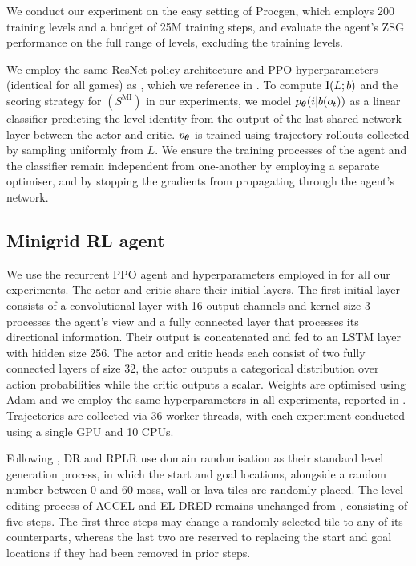 We conduct our experiment on the easy setting of Procgen, which employs 200 training levels and a budget of 25M training steps, and evaluate the agent's ZSG performance on the full range of levels, excluding the training levels.

We employ the same ResNet policy architecture and PPO hyperparameters (identical for all games) as \cite{procgen}, which we reference in . To compute $\text{I}(L;b)$ and the scoring strategy for $(S^\text{MI})$ in our experiments, we model $p_{\bm{\theta}}(i|b(o_t))$ as a linear classifier predicting the level identity from the output of the last shared network layer between the actor and critic. $p_{\bm{\theta}}$ is trained using trajectory rollouts collected by sampling uniformly from $L$. We ensure the training processes of the agent and the classifier remain independent from one-another by employing a separate optimiser, and by stopping the gradients from propagating through the agent's network.

\subsection{Minigrid RL agent} \label{c3:app:impl_minigrid}

We use the recurrent PPO agent and hyperparameters employed in \cite{ACCEL} for all our experiments. The actor and critic share their initial layers. The first initial layer consists of a convolutional layer with 16 output channels and kernel size 3 processes the agent's view and a fully connected layer that processes its directional information. Their output is concatenated and fed to an LSTM layer with hidden size 256. The actor and critic heads each consist of two fully connected layers of size 32, the actor outputs a categorical distribution over action probabilities while the critic outputs a scalar. Weights are optimised using Adam and we employ the same hyperparameters in all experiments, reported in . Trajectories are collected via 36 worker threads, with each experiment conducted using a single GPU and 10 CPUs.

Following \cite{ACCEL}, DR and RPLR use domain randomisation as their standard level generation process, in which the start and goal locations, alongside a random number between 0 and 60 moss, wall or lava tiles are randomly placed. The level editing process of ACCEL and EL-DRED remains unchanged from \cite{ACCEL}, consisting of five steps. The first three steps may change a randomly selected tile to any of its counterparts, whereas the last two are reserved to replacing the start and goal locations if they had been removed in prior steps.

